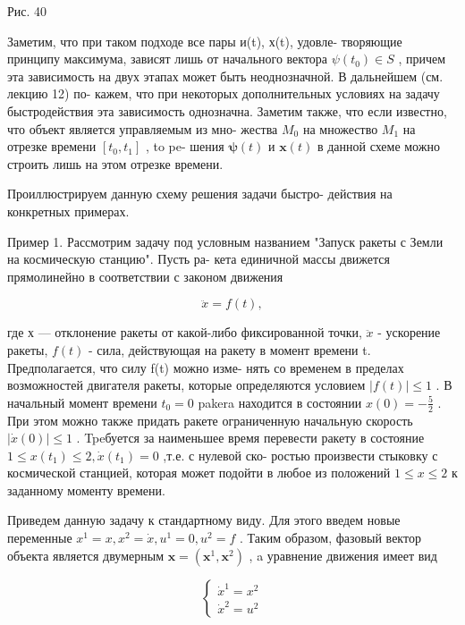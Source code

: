 \documentclass[8pt]{extarticle}
\begin{document}
Рис. 40

Заметим, что при таком подходе все пары и(t), х(t), удовле- творяющие принципу максимума, зависят лишь от начального вектора \(\psi \left( {t}_{0}\right)  \in  S\) , причем эта зависимость на двух этапах может быть неоднозначной. В дальнейшем (см. лекцию 12) по- кажем, что при некоторых дополнительных условиях на задачу быстродействия эта зависимость однозначна. Заметим также, что если известно, что объект является управляемым из мно- жества \({M}_{0}\) на множество \({M}_{1}\) на отрезке времени \(\left\lbrack  {{t}_{0},{t}_{1}}\right\rbrack\) , to pe- шения \(\mathbf{\psi }\left( t\right)\) и \(\mathbf{x}\left( t\right)\) в данной схеме можно строить лишь на этом отрезке времени.

Проиллюстрируем данную схему решения задачи быстро- действия на конкретных примерах.

Пример 1. Рассмотрим задачу под условным названием "Запуск ракеты с Земли на космическую станцию". Пусть ра- кета единичной массы движется прямолинейно в соответствии с законом движения

\[
\ddot{x} = f\left( t\right) ,
\]

где х — отклонение ракеты от какой-либо фиксированной точки, \(\ddot{x}\) - ускорение ракеты, \(f\left( t\right)\) - сила, действующая на ракету в момент времени t. Предполагается, что силу f(t) можно изме- нять со временем в пределах возможностей двигателя ракеты, которые определяются условием \(\left| {f\left( t\right) }\right|  \leq  1\) . В начальный момент времени \({t}_{0} = 0\) pakera находится в состоянии \(x\left( 0\right)  =  - \frac{5}{2}\) . При этом можно также придать ракете ограниченную начальную скорость \(\left| {\dot{x}\left( 0\right) }\right|  \leq  1\) . Tpeбуется за наименьшее время перевести ракету в состояние \(1 \leq  x\left( {t}_{1}\right)  \leq  2,\dot{x}\left( {t}_{1}\right)  = 0\) ,т.е. с нулевой ско- ростью произвести стыковку с космической станцией, которая может подойти в любое из положений \(1 \leq  x \leq  2\) к заданному моменту времени.

Приведем данную задачу к стандартному виду. Для этого введем новые переменные \({x}^{1} = x,{x}^{2} = \dot{x},{u}^{1} = 0,{u}^{2} = f\) . Таким образом, фазовый вектор объекта является двумерным \(\mathbf{x} = \left( {{\mathbf{x}}^{1},{\mathbf{x}}^{2}}\right)\) , a уравнение движения имеет вид

\[
\left\{  \begin{array}{l} {\dot{x}}^{1} = {x}^{2} \\  {\dot{x}}^{2} = {u}^{2} \end{array}\right. \tag{10.6}
\]
\end{document}
